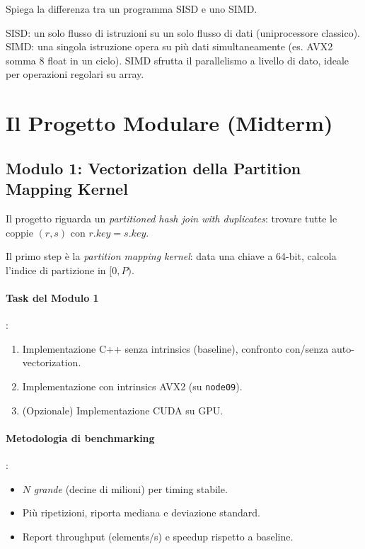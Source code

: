 \documentclass[11pt,a4paper]{article}
\theoremstyle{remark}
\newenvironment{esercizio}[1][]{%
  \begin{tcolorbox}[breakable,title={\textbf{Esercizio / Domanda d'esame}\ifx&#1&\else: #1\fi},
    colback=yellow!5!white, colframe=orange!75!black, fonttitle=\small\bfseries]%
}{%
  \end{tcolorbox}%
}
\newenvironment{risposta}{%
  \begin{tcolorbox}[breakable,title={\textbf{Risposta}},
    colback=green!5!white, colframe=green!50!black, fonttitle=\small\bfseries]%
}{%
  \end{tcolorbox}%
}
\begin{document}
\begin{esercizio}
Spiega la differenza tra un programma SISD e uno SIMD.
\end{esercizio}
\begin{risposta}
SISD: un solo flusso di istruzioni su un solo flusso di dati (uniprocessore classico). SIMD: una singola istruzione opera su più dati simultaneamente (es. AVX2 somma 8 float in un ciclo). SIMD sfrutta il parallelismo a livello di dato, ideale per operazioni regolari su array.
\end{risposta}

\section{Il Progetto Modulare (Midterm)}

\subsection{Modulo 1: Vectorization della Partition Mapping Kernel}

Il progetto riguarda un \emph{partitioned hash join with duplicates}: trovare tutte le coppie $(r,s)$ con $r.key = s.key$.

Il primo step è la \emph{partition mapping kernel}: data una chiave a 64-bit, calcola l'indice di partizione in $[0, P)$.

\paragraph{Task del Modulo 1}:
\begin{enumerate}
  \item Implementazione C++ senza intrinsics (baseline), confronto con/senza auto-vectorization.
  \item Implementazione con intrinsics AVX2 (su \texttt{node09}).
  \item (Opzionale) Implementazione CUDA su GPU.
\end{enumerate}

\paragraph{Metodologia di benchmarking}:
\begin{itemize}
  \item $N$ \emph{grande} (decine di milioni) per timing stabile.
  \item Più ripetizioni, riporta mediana e deviazione standard.
  \item Report throughput (elements/s) e speedup rispetto a baseline.
\end{itemize}
\end{document}
